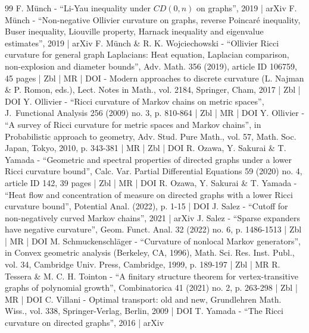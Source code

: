 \begin{thebibliography}{99}
F. Münch - “Li-Yau inequality under $ CD (0, n) $ on graphs”, 2019 | arXiv
F. Münch - “Non-negative Ollivier curvature on graphs, reverse Poincaré inequality, Buser inequality, Liouville property, Harnack inequality and eigenvalue estimates”, 2019 | arXiv
F. Münch \& R. K. Wojciechowski - “Ollivier Ricci curvature for general graph Laplacians: Heat equation, Laplacian comparison, non-explosion and diameter bounds”, Adv. Math. 356 (2019), article ID 106759, 45 pages | Zbl | MR | DOI
- Modern approaches to discrete curvature (L. Najman \& P. Romon, eds.), Lect. Notes in Math., vol. 2184, Springer, Cham, 2017 | Zbl | DOI
Y. Ollivier - “Ricci curvature of Markov chains on metric spaces”, J. Functional Analysis 256 (2009) no. 3, p. 810-864 | Zbl | MR | DOI
Y. Ollivier - “A survey of Ricci curvature for metric spaces and Markov chains”, in Probabilistic approach to geometry, Adv. Stud. Pure Math., vol. 57, Math. Soc. Japan, Tokyo, 2010, p. 343-381 | MR | Zbl | DOI
R. Ozawa, Y. Sakurai \& T. Yamada - “Geometric and spectral properties of directed graphs under a lower Ricci curvature bound”, Calc. Var. Partial Differential Equations 59 (2020) no. 4, article ID 142, 39 pages | Zbl | MR | DOI
R. Ozawa, Y. Sakurai \& T. Yamada - “Heat flow and concentration of measure on directed graphs with a lower Ricci curvature bound”, Potential Anal. (2022), p. 1-15 | DOI
J. Salez - “Cutoff for non-negatively curved Markov chains”, 2021 | arXiv
J. Salez - “Sparse expanders have negative curvature”, Geom. Funct. Anal. 32 (2022) no. 6, p. 1486-1513 | Zbl | MR | DOI
M. Schmuckenschläger - “Curvature of nonlocal Markov generators”, in Convex geometric analysis (Berkeley, CA, 1996), Math. Sci. Res. Inst. Publ., vol. 34, Cambridge Univ. Press, Cambridge, 1999, p. 189-197 | Zbl | MR
R. Tessera \& M. C. H. Tointon - “A finitary structure theorem for vertex-transitive graphs of polynomial growth”, Combinatorica 41 (2021) no. 2, p. 263-298 | Zbl | MR | DOI
C. Villani - Optimal transport: old and new, Grundlehren Math. Wiss., vol. 338, Springer-Verlag, Berlin, 2009 | DOI
T. Yamada - “The Ricci curvature on directed graphs”, 2016 | arXiv
\end{thebibliography}
